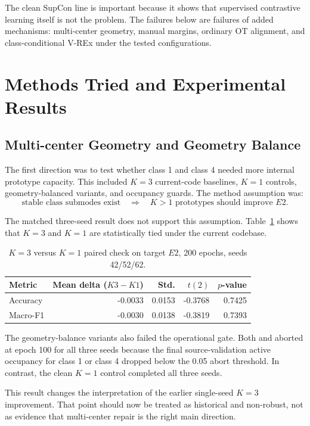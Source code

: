 \documentclass[11pt]{article}
\newcommand{\code}[1]{\texttt{\detokenize{#1}}}
\begin{document}
The clean SupCon line is important because it shows that supervised contrastive learning itself is not the problem. The failures below are failures of added mechanisms: multi-center geometry, manual margins, ordinary OT alignment, and class-conditional V-REx under the tested configurations.

\section{Methods Tried and Experimental Results}

\subsection{Multi-center Geometry and Geometry Balance}

The first direction was to test whether class 1 and class 4 needed more internal prototype capacity. This included $K=3$ current-code baselines, $K=1$ controls, geometry-balanced variants, and occupancy guards. The method assumption was:
\[
\text{stable class submodes exist} \quad \Rightarrow \quad K>1 \text{ prototypes should improve } E2.
\]

The matched three-seed result does not support this assumption. Table~\ref{tab:k3_k1} shows that $K=3$ and $K=1$ are statistically tied under the current codebase.

\begin{table}[H]
\centering
\small
\caption{$K=3$ versus $K=1$ paired check on target $E2$, 200 epochs, seeds 42/52/62.}
\label{tab:k3_k1}
\begin{tabular}{lrrrr}
\toprule
Metric & Mean delta ($K3-K1$) & Std. & $t(2)$ & $p$-value \\
\midrule
Accuracy & -0.0033 & 0.0153 & -0.3768 & 0.7425 \\
Macro-F1 & -0.0030 & 0.0138 & -0.3819 & 0.7393 \\
\bottomrule
\end{tabular}
\end{table}

The geometry-balance variants also failed the operational gate. Both \code{geom_balance} and \code{geom_balance_div} aborted at epoch 100 for all three seeds because the final source-validation active occupancy for class 1 or class 4 dropped below the 0.05 abort threshold. In contrast, the clean $K=1$ control completed all three seeds.

This result changes the interpretation of the earlier single-seed $K=3$ improvement. That point should now be treated as historical and non-robust, not as evidence that multi-center repair is the right main direction.
\end{document}
